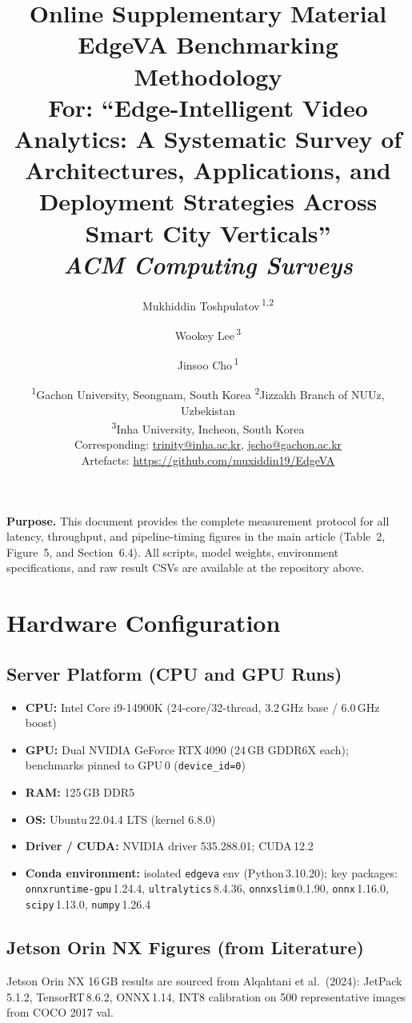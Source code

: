 \documentclass[11pt,a4paper]{article}
\title{\textbf{Online Supplementary Material}\\[4pt]
	\large EdgeVA Benchmarking Methodology\\[2pt]
	\normalsize For: ``Edge-Intelligent Video Analytics: A Systematic Survey
	of Architectures, Applications, and Deployment Strategies
	Across Smart City Verticals''\\
	\textit{ACM Computing Surveys}}
\author{Mukhiddin Toshpulatov\,\textsuperscript{1,2} \and
	Wookey Lee\,\textsuperscript{3} \and
	Jinsoo Cho\,\textsuperscript{1}}
\date{%
	\textsuperscript{1}Gachon University, Seongnam, South Korea \quad
	\textsuperscript{2}Jizzakh Branch of NUUz, Uzbekistan\\
	\textsuperscript{3}Inha University, Incheon, South Korea\\[4pt]
	Corresponding: \href{mailto:trinity@inha.ac.kr}{trinity@inha.ac.kr},
	\href{mailto:jscho@gachon.ac.kr}{jscho@gachon.ac.kr}\\[4pt]
	Artefacts: \url{https://github.com/muxiddin19/EdgeVA}}
\begin{document}
	\maketitle
	\tableofcontents
	\bigskip
	
	\noindent\textbf{Purpose.}
	This document provides the complete measurement protocol for all
	latency, throughput, and pipeline-timing figures in the main article
	(Table~2, Figure~5, and Section~6.4). All scripts, model weights,
	environment specifications, and raw result CSVs are available at the
	repository above.
	
	\section{Hardware Configuration}
	
	\subsection{Server Platform (CPU and GPU Runs)}
	
	\begin{itemize}[leftmargin=*, noitemsep]
		\item \textbf{CPU:} Intel Core i9-14900K (24-core/32-thread,
		3.2\,GHz base / 6.0\,GHz boost)
		\item \textbf{GPU:} Dual NVIDIA GeForce RTX\,4090 (24\,GB GDDR6X each);
		benchmarks pinned to GPU\,0 (\texttt{device\_id=0})
		\item \textbf{RAM:} 125\,GB DDR5
		\item \textbf{OS:} Ubuntu\,22.04.4 LTS (kernel 6.8.0)
		\item \textbf{Driver / CUDA:} NVIDIA driver 535.288.01; CUDA\,12.2
		\item \textbf{Conda environment:} isolated \texttt{edgeva} env
		(Python\,3.10.20); key packages:
		\texttt{onnxruntime-gpu}\,1.24.4,
		\texttt{ultralytics}\,8.4.36,
		\texttt{onnxslim}\,0.1.90,
		\texttt{onnx}\,1.16.0,
		\texttt{scipy}\,1.13.0,
		\texttt{numpy}\,1.26.4
	\end{itemize}
	
	\subsection{Jetson Orin NX Figures (from Literature)}
	
	Jetson Orin NX 16\,GB results are sourced from Alqahtani et al.\
	(2024): JetPack\,5.1.2, TensorRT\,8.6.2, ONNX\,1.14, INT8
	calibration on 500 representative images from COCO 2017 val.
	
\end{document}
